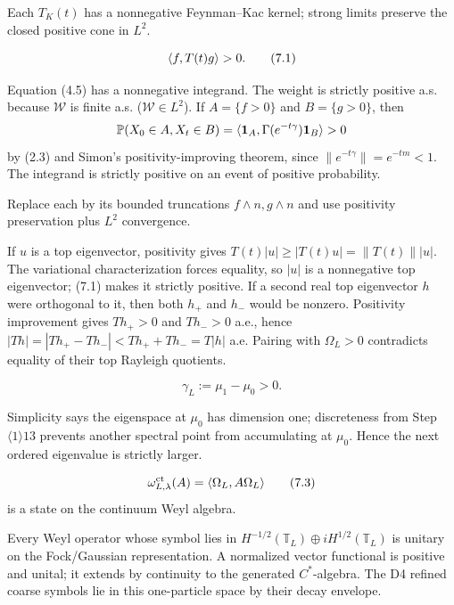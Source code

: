 \documentclass[11pt,a4paper]{article}
\newcommand{\T}{\mathbb T}
\newcommand{\PP}{\mathbb P}
\begin{document}


\Because Each $T_K(t)$ has a nonnegative Feynman--Kac kernel; strong limits preserve
the closed positive cone in $L^2$.

\[
 \langle f,T(t)g\rangle>0.
\tag{7.1}
\]

\Because Equation (4.5) has a nonnegative integrand.  The weight is strictly
positive a.s. because $\mathcal W$ is finite a.s. ($\mathcal W\in L^2$).  If
$A=\{f>0\}$ and $B=\{g>0\}$, then
\[
 \PP(X_0\in A,X_t\in B)
 =\ip{\mathbf1_A}{\Gamma(e^{-t\gamma})\mathbf1_B}>0
\]
by (2.3) and Simon's positivity-improving theorem, since
$\|e^{-t\gamma}\|=e^{-tm}<1$.  The integrand is strictly positive on an event
of positive probability.


\Because Replace each by its bounded truncations $f\wedge n,g\wedge n$ and use
positivity preservation plus $L^2$ convergence.


\Because If $u$ is a top eigenvector, positivity gives
$T(t)|u|\ge|T(t)u|=\|T(t)\||u|$.  The variational characterization forces
equality, so $|u|$ is a nonnegative top eigenvector; (7.1) makes it strictly
positive.  If a second real top eigenvector $h$ were orthogonal to it, then both
$h_+$ and $h_-$ would be nonzero.  Positivity improvement gives
$T h_+>0$ and $T h_->0$ a.e., hence
$|Th|=|Th_+-Th_-|<Th_++Th_-=T|h|$ a.e.  Pairing with $\Omega_L>0$
contradicts equality of their top Rayleigh quotients.

\[
 \gamma_L:=\mu_1-\mu_0>0.
\tag{7.2}
\]

\Because Simplicity says the eigenspace at $\mu_0$ has dimension one;
discreteness from Step $\langle1\rangle13$ prevents another spectral point from
accumulating at $\mu_0$.  Hence the next ordered eigenvalue is strictly larger.

\[
 \omega^{\rm ct}_{L,\lambda}(A)=\langle \Omega_L,A\Omega_L\rangle
\tag{7.3}
\]
is a state on the continuum Weyl algebra.

\Because Every Weyl operator whose symbol lies in
$H^{-1/2}(\T_L)\oplus iH^{1/2}(\T_L)$ is unitary on the Fock/Gaussian
representation.  A normalized vector functional is positive and unital; it extends
by continuity to the generated $C^*$-algebra.  The D4 refined coarse symbols lie in
this one-particle space by their decay envelope.
\end{document}

